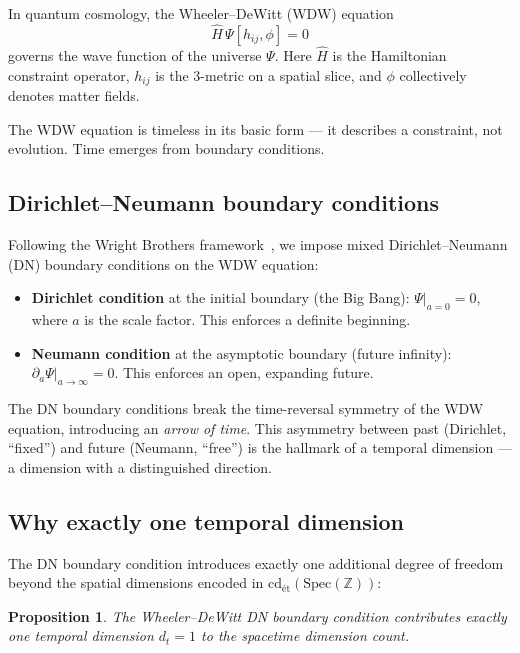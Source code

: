 \documentclass[12pt,a4paper]{article}
\newtheorem{proposition}[theorem]{Proposition}
\theoremstyle{definition}
\newcommand{\Spec}{\mathrm{Spec}}
\newcommand{\cd}{\mathrm{cd}}
\newcommand{\ZZ}{\mathbb{Z}}
\begin{document}
In quantum cosmology, the Wheeler--DeWitt (WDW) equation~\cite{DeWitt1967,Wheeler1968}
\[
  \hat{H}\,\Psi[h_{ij}, \phi] = 0
\]
governs the wave function of the universe $\Psi$. Here $\hat{H}$ is the Hamiltonian
constraint operator, $h_{ij}$ is the 3-metric on a spatial slice, and $\phi$
collectively denotes matter fields.

The WDW equation is timeless in its basic form --- it describes a constraint, not
evolution. Time emerges from boundary conditions.

\subsection{Dirichlet--Neumann boundary conditions}

Following the Wright Brothers framework~\cite{WB-WDW}, we impose mixed
Dirichlet--Neumann (DN) boundary conditions on the WDW equation:

\begin{itemize}
  \item \textbf{Dirichlet condition} at the initial boundary (the Big Bang):
    $\Psi|_{a=0} = 0$, where $a$ is the scale factor. This enforces a definite
    beginning.
  \item \textbf{Neumann condition} at the asymptotic boundary (future infinity):
    $\partial_a \Psi|_{a \to \infty} = 0$. This enforces an open, expanding future.
\end{itemize}

The DN boundary conditions break the time-reversal symmetry of the WDW equation,
introducing an \emph{arrow of time}. This asymmetry between past (Dirichlet,
``fixed'') and future (Neumann, ``free'') is the hallmark of a temporal dimension
--- a dimension with a distinguished direction.

\subsection{Why exactly one temporal dimension}

The DN boundary condition introduces exactly one additional degree of freedom
beyond the spatial dimensions encoded in $\cd_{\text{\'et}}(\Spec(\ZZ))$:

\begin{proposition}\label{prop:temporal}
The Wheeler--DeWitt DN boundary condition contributes exactly one temporal dimension
$d_t = 1$ to the spacetime dimension count.
\end{proposition}
\end{document}
